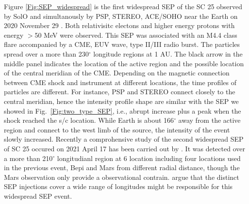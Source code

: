 Figure \ref{Fig:SEP_widespread} is the first widespread \ac{SEP} of the \ac{SC} 25 observed by \ac{SolO} and simultanously by \ac{PSP}, \ac{STEREO}, \ac{ACE}/\ac{SOHO} near the Earth on 2020 November 29 \citet{Kolhoff2021AA, Kouloumvakos2022AA, Palmerio2022SpWea}. Both relativisitc electons and higher energy protons with energy $>$50 MeV were observed. This SEP was associated with an M4.4 class flare accompanied by a \ac{CME}, \ac{EUV} wave, type II/III radio burst. The particles spread over a more than 230$^\circ$ longitude regions at 1 AU. The black arrow in the middle panel indicates the location of the active region and the possible location of the central meridian of the \ac{CME}.  Depending on the magnetic connection between \ac{CME} shock and instrument at different locations, the time profiles of particles are different. For instance, \ac{PSP} and \ac{STEREO} connect closely to the central meridian, hence the intensity profile shape are similar with the \ac{SEP} we showed in Fig.~\ref{Fig:two_type_SEP}, i.e., abrupt increase plus a peak when the shock reached the s/c location. While Earth is about 166$^\circ$ away from the active region and connect to the west limb of the source, the intensity of the event slowly increased.
Recently a comprohensive study of the second widespread \ac{SEP} of \ac{SC} 25 occured on 2021 April 17 has been carried out by \citep{dresing202317}. It was detected over a more than 210$^\circ$ longitudianl region at 6 location including four locations used in the previous event, \ac{Bepi} and Mars from different radial distance, though the Mars observation only provide a observational contrain. \citep{dresing202317} argue that the distinct SEP injections cover a wide range of longitudes might be responsible for this widespread SEP event.

